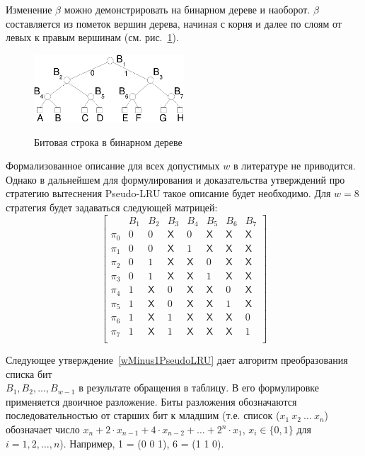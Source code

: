 \documentclass[14pt]{extreport}
\newcommand{\PseudoLRU}{\textsf{Pseudo-LRU}\xspace}
\begin{document}
Изменение $\beta$ можно демонстрировать на бинарном дереве и
наоборот. $\beta$ составляется из пометок вершин дерева,
начиная с корня и далее по слоям от левых к правым вершинам (см.
рис.~\ref{plru_bittree}).

\begin{figure}[h] \center
  \includegraphics[width=0.5\textwidth]{1.review/plru}\\
  \caption{Битовая строка в бинарном дереве}\label{plru_bittree}
\end{figure}

Формализованное описание для всех допустимых $w$ в литературе не
приводится. Однако в дальнейшем для формулирования и доказательства
утверждений про стратегию вытеснения \PseudoLRU такое описание будет
необходимо. Для $w=8$ стратегия будет задаваться следующей матрицей:
$$
\left[
  \begin{array}{c|ccccccc}
          & B_1 & B_2 & B_3 & B_4 & B_5 & B_6 & B_7 \\ \hline
    \pi_0 & 0 & 0 & \textsf{X} & 0 & \textsf{X} & \textsf{X} & \textsf{X} \\
    \pi_1 & 0 & 0 & \textsf{X} & 1 & \textsf{X} & \textsf{X} & \textsf{X} \\
    \pi_2 & 0 & 1 & \textsf{X} & \textsf{X} & 0 & \textsf{X} & \textsf{X} \\
    \pi_3 & 0 & 1 & \textsf{X} & \textsf{X} & 1 & \textsf{X} & \textsf{X} \\
    \pi_4 & 1 & \textsf{X} & 0 & \textsf{X} & \textsf{X} & 0 & \textsf{X} \\
    \pi_5 & 1 & \textsf{X} & 0 & \textsf{X} & \textsf{X} & 1 & \textsf{X} \\
    \pi_6 & 1 & \textsf{X} & 1 & \textsf{X} & \textsf{X} & \textsf{X} & 0 \\
    \pi_7 & 1 & \textsf{X} & 1 & \textsf{X} & \textsf{X} & \textsf{X} & 1 \\
  \end{array}
\right]
$$

Следующее утверждение~\ref{wMinus1PseudoLRU} дает алгоритм
преобразования списка бит\\ $B_1, B_2, ..., B_{w{-}1}$ в результате
обращения в таблицу. В его формулировке применяется двоичное
разложение. Биты разложения обозначаются последовательностью от
старших бит к младшим (т.е. список ($x_1~x_2~\dots~x_n$) обозначает
число $x_n + 2\cdot x_{n-1} + 4\cdot x_{n-2} + \dots + 2^n\cdot x_1$, $x_i \in
\{0,
1\}$ для $i = 1, 2, \dots, n$). Например, 1 = (0 0 1), 6 = (1 1 0).
\end{document}
